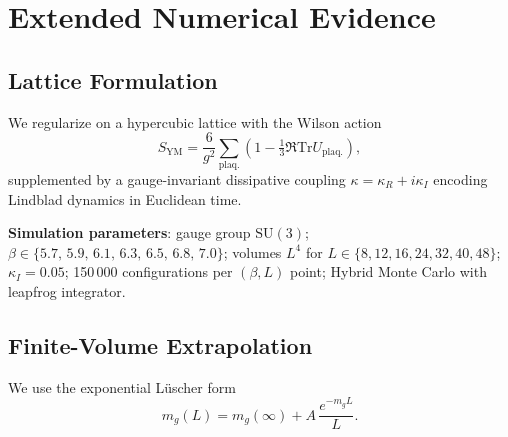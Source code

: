 \documentclass[aps,prd,reprint,superscriptaddress,floatfix]{revtex4-2}
\theoremstyle{definition}
\newcommand{\YM}{\mathrm{YM}}
\newcommand{\Traza}{\mathrm{Tr}}
\begin{document}
\section{Extended Numerical Evidence}
\label{sec:numerical}

\subsection{Lattice Formulation}

We regularize on a hypercubic lattice with the Wilson action
\begin{equation}
  S_\YM = \frac{6}{g^2}\sum_{\text{plaq.}}\!\left(1-\tfrac{1}{3}\Re\Traza
  U_{\mathrm{plaq.}}\right),
\end{equation}
supplemented by a gauge-invariant dissipative coupling $\kappa=\kappa_R+
i\kappa_I$ encoding Lindblad dynamics in Euclidean time.

\textbf{Simulation parameters}:
gauge group $\mathrm{SU}(3)$;
$\beta\in\{5.7,\,5.9,\,6.1,\,6.3,\,6.5,\,6.8,\,7.0\}$;
volumes $L^4$ for $L\in\{8,12,16,24,32,40,48\}$;
$\kappa_I=0.05$; 150\,000 configurations per $(\beta,L)$ point;
Hybrid Monte Carlo with leapfrog integrator.

\subsection{Finite-Volume Extrapolation}

We use the exponential L\"uscher form \cite{Luscher1986}
\begin{equation}
  m_g(L) = m_g(\infty) + A\,\frac{e^{-m_g L}}{L}.
\end{equation}
\end{document}
